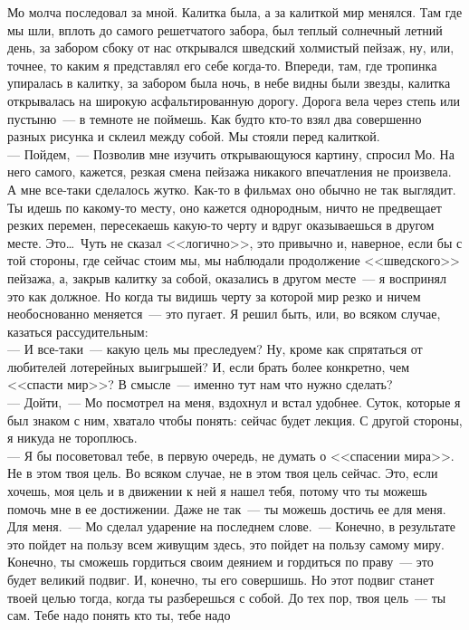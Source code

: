 Мо молча последовал за мной. Калитка была, а за калиткой мир менялся. Там где 
мы шли, вплоть до самого решетчатого забора, был теплый солнечный летний день, за 
забором сбоку от нас открывался шведский холмистый пейзаж, ну, или, точнее, то 
каким я представлял его себе когда-то. Впереди, там, где тропинка упиралась в 
калитку, за забором была ночь, в небе видны были звезды, калитка открывалась на 
широкую асфальтированную дорогу. Дорога вела через степь или пустыню~--- в 
темноте не поймешь. Как будто кто-то взял два совершенно разных рисунка и склеил между 
собой. Мы стояли перед калиткой.\\
--- Пойдем,~--- Позволив мне изучить открывающуюся картину, спросил Мо. На него 
самого, кажется, резкая смена пейзажа никакого впечатления не произвела. А мне 
все-таки сделалось жутко. Как-то в фильмах оно обычно не так выглядит. Ты идешь 
по какому-то месту, оно кажется однородным, ничто не предвещает резких перемен, 
пересекаешь какую-то черту и вдруг оказываешься в другом месте. Это\ldots\ Чуть 
не сказал <<логично>>, это привычно и, наверное, если бы с той стороны, где сейчас 
стоим мы, мы наблюдали продолжение <<шведского>> пейзажа, а, закрыв калитку за 
собой, оказались в другом месте~--- я воспринял это как должное. Но когда ты 
видишь черту за которой мир резко и ничем необоснованно меняется~--- это 
пугает. Я решил быть, или, во всяком случае, казаться рассудительным:\\
--- И все-таки~--- какую цель мы преследуем? Ну, кроме как спрятаться от 
любителей лотерейных выигрышей? И, если брать более конкретно, чем <<спасти мир>>? В 
смысле~--- именно тут нам что нужно сделать?\\
--- Дойти,~--- Мо посмотрел на меня, вздохнул и встал удобнее. Суток, которые я 
был знаком с ним, хватало чтобы понять: сейчас будет лекция. С другой стороны, я 
никуда не тороплюсь.\\
--- Я бы посоветовал тебе, в первую очередь, не думать о <<спасении мира>>. Не в 
этом твоя цель. Во всяком случае, не в этом твоя цель сейчас. Это, если хочешь, 
моя цель и в движении к ней я нашел тебя, потому что ты можешь помочь мне в ее 
достижении. Даже не так~--- ты можешь достичь ее для меня. Для меня.~--- Мо 
сделал ударение на последнем слове.~--- Конечно, в результате это пойдет на пользу 
всем живущим здесь, это пойдет на пользу самому миру. Конечно, ты сможешь гордиться 
своим деянием и гордиться по праву~--- это будет великий подвиг. И, конечно, ты 
его совершишь. Но этот подвиг станет твоей целью тогда, когда ты разберешься с 
собой. До тех пор, твоя цель~--- ты сам. Тебе надо понять кто ты, тебе надо 
